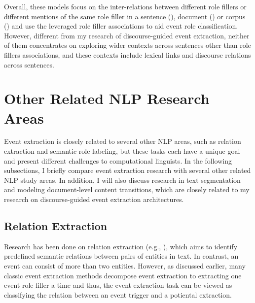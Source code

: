 Overall, these models focus on the inter-relations between different role fillers or 
different mentions of the same role filler in a sentence (\cite{Lu2012,Li13}), 
document (\cite{liao10}) or corpus (\cite{Ji08})   
and use the leveraged role filler associations to 
aid event role classification.
However, different from my research of discourse-guided 
event extraction, neither of them concentrates on exploring wider 
contexts 
across sentences 
other than role fillers associations,  
and these contexts include lexical links and discourse relations across sentences. 



\section{Other Related NLP Research Areas}

Event extraction is closely related to several other NLP areas, such as relation extraction and
semantic role labeling, but
these tasks each have a unique goal and present different challenges to computational
linguists.
In the following subsections, I briefly compare event extraction research
with several other related NLP study areas.
In addition, I will also discuss research in text segmentation and
modeling document-level content transitions, which
are closely related to my research on discourse-guided event extraction
architectures.


\subsection{Relation Extraction}

Research has been done on relation extraction (e.g.,
\cite{roth01,zelenko03,Nanda04,Bunescu05,bunescu07}), 
which aims to identify predefined semantic relations 
between 
pairs of entities in text. 
In contrast, an event can consist of more than two entities. 
However, as discussed earlier, many classic event extraction 
methods decompose event extraction to extracting 
one event role filler a time and thus, the event extraction 
task can be viewed as classifying the relation between 
an event trigger and a potiental extraction.

